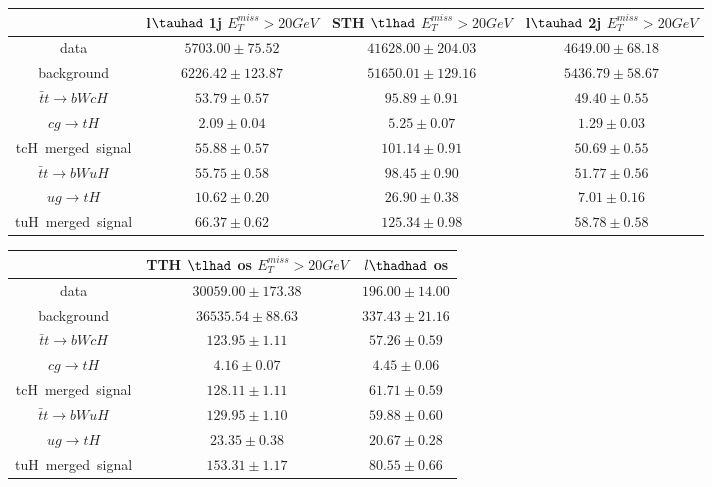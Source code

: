 \centering
\begin{tabular}{|c|c|c|c|} \hline
 & l$\tauhad$ 1j  $E_T^{miss}>20GeV$ & STH $\tlhad$   $E_T^{miss}>20GeV$ & l$\tauhad$ 2j  $E_T^{miss}>20GeV$\\\hline
data & $5703.00\pm75.52$ & $41628.00\pm204.03$ & $4649.00\pm68.18$\\\hline
background & $6226.42\pm123.87$ & $51650.01\pm129.16$ & $5436.79\pm58.67$\\\hline
$\bar{t}t\to bWcH$ & $53.79\pm0.57$ & $95.89\pm0.91$ & $49.40\pm0.55$\\\hline
$cg\to tH$ & $2.09\pm0.04$ & $5.25\pm0.07$ & $1.29\pm0.03$\\\hline
tcH~merged~signal & $55.88\pm0.57$ & $101.14\pm0.91$ & $50.69\pm0.55$\\\hline
$\bar{t}t\to bWuH$ & $55.75\pm0.58$ & $98.45\pm0.90$ & $51.77\pm0.56$\\\hline
$ug\to tH$ & $10.62\pm0.20$ & $26.90\pm0.38$ & $7.01\pm0.16$\\\hline
tuH~merged~signal & $66.37\pm0.62$ & $125.34\pm0.98$ & $58.78\pm0.58$\\\hline
\end{tabular}
\begin{tabular}{|c|c|c|} \hline
 & TTH $\tlhad$ os  $E_T^{miss}>20GeV$ & $l\thadhad$ os\\\hline
data & $30059.00\pm173.38$ & $196.00\pm14.00$\\\hline
background & $36535.54\pm88.63$ & $337.43\pm21.16$\\\hline
$\bar{t}t\to bWcH$ & $123.95\pm1.11$ & $57.26\pm0.59$\\\hline
$cg\to tH$ & $4.16\pm0.07$ & $4.45\pm0.06$\\\hline
tcH~merged~signal & $128.11\pm1.11$ & $61.71\pm0.59$\\\hline
$\bar{t}t\to bWuH$ & $129.95\pm1.10$ & $59.88\pm0.60$\\\hline
$ug\to tH$ & $23.35\pm0.38$ & $20.67\pm0.28$\\\hline
tuH~merged~signal & $153.31\pm1.17$ & $80.55\pm0.66$\\\hline
\end{tabular}
